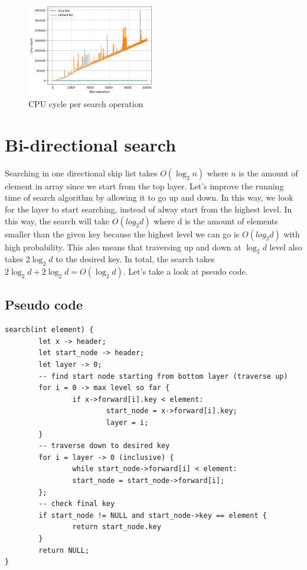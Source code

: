 \documentclass[a4paper, 12pt]{report}
\begin{document}
\begin{figure}[h]
        \centering
        \includegraphics[width=0.5\textwidth,scale=0.5]{skip_list_scan.png}
        \caption{\label{fig:skip_list_scan} CPU cycle per search operation}
\end{figure}

\section{Bi-directional search}

Searching in one directional skip list takes $O(\log_2 n)$ where $n$ is the amount of element in array since we start from the top layer.
Let's improve the running time of search algorithm by allowing it to go up and down. In this way, we look for the layer to start searching, 
instead of alway start from the highest level. In this way, the search will take $O(log_2 d)$ where d is the amount of elements smaller than the given key
because the highest level we can go is $O(log_2 d)$ with high probability. This also means that traversing up and down at $\log_2 d$ level also takes 
$2\log_2 d$ to the desired key. In total, the search takes $2\log_2 d + 2\log_2 d = O(\log_2 d)$. Let's take a look at pseudo code.

\subsection{Pseudo code}
\begin{verbatim}
search(int element) {
        let x -> header;
        let start_node -> header;
        let layer -> 0;
        -- find start node starting from bottom layer (traverse up)
        for i = 0 -> max level so far {
                if x->forward[i].key < element:
                        start_node = x->forward[i].key;
                        layer = i;
        }
        -- traverse down to desired key
        for i = layer -> 0 (inclusive) {
                while start_node->forward[i] < element:
                start_node = start_node->forward[i];
        };
        -- check final key
        if start_node != NULL and start_node->key == element {
                return start_node.key
        }
        return NULL;
}
\end{verbatim}
\end{document}
